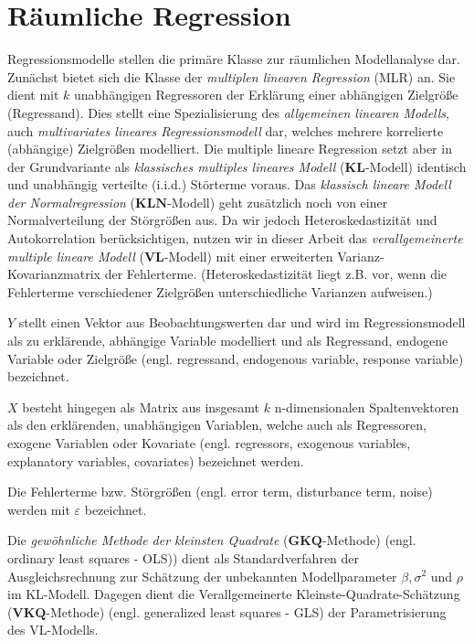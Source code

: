 \chapter{Räumliche Regression}
\label{ch:regression}

Regressionsmodelle stellen die primäre Klasse zur räumlichen Modellanalyse dar. Zunächst bietet sich die Klasse 
der \emph{multiplen linearen Regression} (MLR) an. Sie dient mit $k$ unabhängigen Regressoren der Erklärung einer 
abhängigen Zielgröße (Regressand). Dies stellt eine Spezialisierung des \emph{allgemeinen linearen Modells}, 
auch \emph{multivariates lineares Regressionsmodell} dar, welches mehrere korrelierte (abhängige) Zielgrößen modelliert. Die multiple lineare Regression setzt 
aber in der Grundvariante als \emph{klassisches multiples lineares Modell} ($\mathbf{KL}$-Modell) identisch und unabhängig 
verteilte (i.i.d.) Störterme voraus. Das \emph{klassisch lineare Modell der Normalregression} ($\mathbf{KLN}$-Modell) geht zusätzlich noch von einer 
Normalverteilung der Störgrößen aus.
Da wir jedoch Heteroskedastizität und Autokorrelation berücksichtigen, 
nutzen wir in dieser Arbeit das \emph{verallgemeinerte multiple lineare Modell} ($\mathbf{VL}$-Modell) mit einer erweiterten Varianz-Kovarianzmatrix der Fehlerterme.
(Heteroskedastizität liegt z.B. vor, wenn die Fehlerterme verschiedener Zielgrößen unterschiedliche Varianzen aufweisen.)

$Y$ stellt einen Vektor aus Beobachtungswerten dar und wird im Regressionsmodell als zu erklärende, abhängige Variable modelliert 
und als Regressand, endogene Variable oder Zielgröße (engl. regressand, endogenous variable, response variable) bezeichnet.

$X$ besteht hingegen als Matrix aus insgesamt $k$ n-dimensionalen Spaltenvektoren als den erklärenden, unabhängigen Variablen, welche auch als Regressoren, exogene Variablen oder Kovariate
(engl. regressors, exogenous variables, explanatory variables, covariates) bezeichnet werden.

Die Fehlerterme bzw. Störgrößen (engl. error term, disturbance term, noise) werden mit $\varepsilon$ bezeichnet.

Die \emph{gewöhnliche Methode der kleinsten Quadrate} ($\mathbf{GKQ}$-Methode) (engl. ordinary least squares - OLS)) dient als Standardverfahren der Ausgleichsrechnung 
zur Schätzung der unbekannten Modellparameter $\beta, \sigma^{2}$ und $\rho$ im KL-Modell.
Dagegen dient die Verallgemeinerte Kleinste-Quadrate-Schätzung ($\mathbf{VKQ}$-Methode) (engl. generalized least squares - GLS) der Parametrisierung des VL-Modells.

